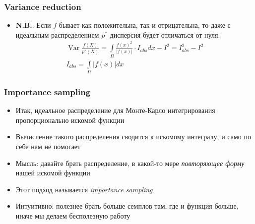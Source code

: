 \documentclass[10pt]{beamer}
\begin{document}
\begin{frame}
\frametitle{Variance reduction}
\begin{itemize}
\item \alert{\textbf{N.B.}}: Если \begin{math}f\end{math} бывает как положительна, так и отрицательна, то даже с идеальным распределением \begin{math}p^*\end{math} дисперсия будет отличаться от нуля:
\begin{gather*}
\operatorname{Var}\frac{f(X)}{p^*(X)} = \int\limits_\Omega \frac{f(x)^2}{|f(x)|}\cdot I_{abs} dx - I^2 = I_{abs}^2 - I^2 \\
I_{abs} = \int\limits_\Omega |f(x)|dx
\end{gather*}
\end{itemize}
\end{frame}

\begin{frame}
\frametitle{Importance sampling}
\begin{itemize}
\item Итак, идеальное распределение для Монте-Карло интегрирования пропорционально искомой функции
\pause
\item Вычисление такого распределения сводится к искомому интегралу, и само по себе нам не помогает
\pause
\item Мысль: давайте брать распределение, в какой-то мере \textit{повторяющее форму} нашей искомой функции
\pause
\item Этот подход называется \textit{importance sampling}
\pause
\item Интуитивно: полезнее брать больше семплов там, где и функция больше, иначе мы делаем бесполезную работу
\end{itemize}
\end{frame}
\end{document}
